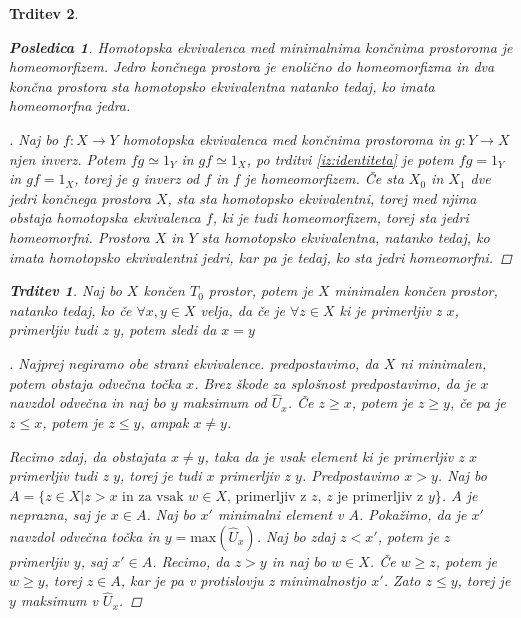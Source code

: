 \documentclass[a4paper,12pt]{article}
\theoremstyle{definition}
\theoremstyle{plain}
\theoremstyle{definition}
\theoremstyle{plain}
\newtheorem{trditev}{Trditev}
\theoremstyle{plain}
\newtheorem{posledica}{Posledica}
\theoremstyle{plain}
\theoremstyle{plain}
\newenvironment{dokaz}{\begin{proof}[\bfseries\upshape\proofname]}{\end{proof}}
\begin{document}
\begin{trditev}
\begin{posledica}
    Homotopska ekvivalenca med minimalnima končnima prostoroma je homeomorfizem. Jedro končnega prostora je enolično do homeomorfizma in dva končna prostora sta homotopsko ekvivalentna natanko tedaj, ko imata homeomorfna jedra.
\end{posledica}

\begin{dokaz}
    Naj bo $f:X\rightarrow Y$ homotopska ekvivalenca med 
    končnima prostoroma in $g:Y\rightarrow X$ njen inverz. 
    Potem $fg\simeq 1_Y$ in $gf \simeq 1_X$, po trditvi 
    \ref{iz:identiteta} je potem $fg = 1_Y$ in $gf = 1_X$,
    torej je $g$ inverz od $f$ in $f$ je homeomorfizem. Če 
    sta $X_0$ in $X_1$ dve jedri končnega prostora $X$, sta 
    sta homotopsko ekvivalentni, torej med njima obstaja homotopska ekvivalenca $f$, 
    ki je tudi homeomorfizem, torej sta jedri homeomorfni. 
    Prostora $X$ in $Y$ sta homotopsko ekvivalentna, 
    natanko tedaj, ko imata homotopsko ekvivalentni jedri, 
    kar pa je tedaj, ko sta jedri homeomorfni.
\end{dokaz}


\begin{trditev}
Naj bo $X$ končen $T_0$ prostor, potem je $X$ minimalen končen prostor, natanko tedaj, ko če $\forall x,y\in X$ velja, da če je  $\forall z\in X$ ki je primerljiv z $x$, primerljiv tudi z $y$, potem sledi da $x=y$
\end{trditev}

\begin{dokaz}
    Najprej negiramo obe strani ekvivalence. predpostavimo, da $X$ ni minimalen, potem obstaja odvečna točka $x$. Brez škode za splošnost predpostavimo, da je $x$ navzdol odvečna in naj bo $y$ maksimum od $\hat{U}_x$. Če $z\geq x$, potem je $z\geq y$, če pa je $z\le x$, potem je $z\leq y$, ampak $x\neq y$.

    Recimo zdaj, da obstajata $x\neq y$, taka da je vsak 
    element ki je primerljiv z $x$ primerljiv tudi z $y$, 
    torej je tudi $x$ primerljiv z $y$. Predpostavimo 
    $x>y$. Naj bo $A=\{z\in X |  z>x \text{ in za vsak $w\in 
    X$, primerljiv z $z$, $z$ je primerljiv z $y$}\}$. $A$ 
    je neprazna, saj je $x\in A$. Naj bo $x'$ minimalni 
    element v $A$. Pokažimo, da je $x'$ navzdol odvečna 
    točka in $y=\text{max}(\hat{U}_x)$. Naj bo zdaj $z<x'$, potem 
    je $z$ primerljiv $y$, saj $x'\in A$. Recimo, da $z>y$ 
    in naj bo $w\in X$. Če $w\geq z$, potem je $w\geq y$, 
    torej $z\in A$, kar je pa v protislovju z minimalnostjo 
    $x'$. Zato $z\leq y$, torej je $y$ maksimum v 
    $\hat{U}_x$.
\end{dokaz}


\end{trditev}
\end{document}
